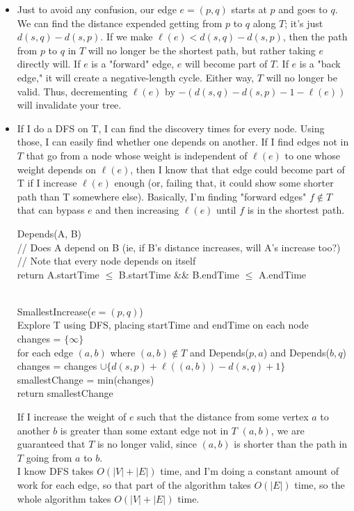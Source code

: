 \documentclass[11pt]{article}
\begin{document}
\begin{solution}
    \begin{itemize}
        \item Just to avoid any confusion, our edge $e = (p, q)$ starts at $p$ and goes to $q$. We can find the distance expended getting from $p$ to $q$ along $T$; it's just $d(s, q) - d(s, p)$. If we make $\ell(e) < d(s, q) - d(s, p)$, then the path from $p$ to $q$ in $T$ will no longer be the shortest path, but rather taking $e$ directly will. If $e$ is a "forward" edge, $e$ will become part of $T$. If $e$ is a "back edge," it will create a negative-length cycle. Either way, $T$ will no longer be valid. Thus, decrementing $\ell(e)$ by $-(d(s, q) - d(s, p) - 1 - \ell(e))$ will invalidate your tree.
        \item If I do a DFS on T, I can find the discovery times for every node. Using those, I can easily find whether one depends on another. If I find edges not in $T$ that go from a node whose weight is independent of $\ell(e)$ to one whose weight depends on $\ell(e)$, then I know that that edge could become part of T if I increase $\ell(e)$ enough (or, failing that, it could show some shorter path than T somewhere else). Basically, I'm finding "forward edges" $f \not \in T$ that can bypass $e$ and then increasing $\ell(e)$ until $f$ is in the shortest path.
            \begin{algo}
                Depends(A, B) \+
                \\ // Does A depend on B (ie, if B's distance increases, will A's increase too?)
                \\ // Note that every node depends on itself
                \\ return A.startTime $\leq$ B.startTime \&\& B.endTime $\leq$ A.endTime \-

                \\ SmallestIncrease($e = (p, q)$) \+
                \\ Explore T using DFS, placing startTime and endTime on each node 
                \\ changes = $\{\infty\}$
                \\ for each edge $(a, b)$ where $(a, b) \not \in T$ and Depends($p, a$) and Depends($b, q$) \+
                \\ changes = changes $\cup \{d(s, p) + \ell((a, b)) - d(s, q) + 1\}$ \-
                \\ smallestChange = min(changes)
                \\ return smallestChange
            \end{algo}
            If I increase the weight of $e$ such that the distance from some vertex $a$ to another $b$ is greater than some extant edge not in $T$ $(a, b)$, we are guaranteed that $T$ is no longer valid, since $(a, b)$ is shorter than the path in $T$ going from $a$ to $b$.
            \\ I know DFS takes $O(|V| + |E|)$ time, and I'm doing a constant amount of work for each edge, so that part of the algorithm takes $O(|E|)$ time, so the whole algorithm takes $O(|V|+|E|)$ time. 
    \end{itemize}
\end{solution}
\end{document}
